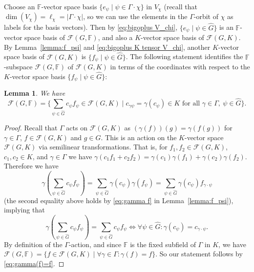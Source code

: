 \documentclass[12pt, oneside]{amsart}
\newtheorem{lemma}[theorem]{\bf Lemma}
\def\field{K}
\def\FF{\mathbb{F}}
\begin{document}
Choose an $\FF$-vector space basis $\{e_\psi\mid \psi\in \Gamma\cdot \chi\}$ in 
$V_\chi$ (recall that $\dim(V_\chi)=\ell_\chi=|\Gamma\cdot \chi|$, so we can use 
the elements in the $\Gamma$-orbit of $\chi$ as labels for the basis vectors). 
Then by \eqref{eq:bigoplus V_chi}, 
$\{e_\psi\mid \psi\in \widehat G\}$ is an $\FF$-vector space basis of $\mathcal{F}(G,\FF)$, and 
also a $\field$-vector space basis of $\mathcal{F}(G,\field)$. 
By Lemma~\ref{lemma:f_psi} and \eqref{eq:bigoplus K tensor V_chi}, another $\field$-vector space basis of 
$\mathcal{F}(G,\field)$ is 
$\{f_\psi\mid \psi\in \widehat G\}$.  
The following statement identifies the $\FF$-subspace $\mathcal{F}(G,\FF)$ of 
$\mathcal{F}(G,\field)$ in terms of the coordinates with respect to the 
$\field$-vector space basis 
$\{f_\psi\mid \psi\in \widehat G\}$:  

\begin{lemma} \label{lemma:F(G,F)} 
We have 
\[\mathcal{F}(G,\FF)=
\{\sum_{\psi\in\widehat G} c_\psi f_\psi\in \mathcal{F}(G,\field)\mid c_{\gamma\psi}=\gamma(c_\psi)\in \field\text{ for all }
\gamma\in\Gamma, \ \psi\in\widehat  G\}.\] 
\end{lemma} 

\begin{proof} 
Recall that $\Gamma$ acts on $\mathcal{F}(G,\field)$ as $(\gamma(f))(g)=\gamma(f(g))$ for 
$\gamma\in \Gamma$, $f\in \mathcal{F}(G,\field)$ and $g\in G$. This is an action on the $\field$-vector space $\mathcal{F}(G,\field)$ 
via semilinear transformations. That is,  
for $f_1,f_2\in \mathcal{F}(G,\field)$, $c_1,c_2\in \field$, and $\gamma\in \Gamma$ we have 
$\gamma(c_1f_1+c_2f_2)=\gamma(c_1)\gamma(f_1)+\gamma(c_2)\gamma(f_2)$. 
Therefore we have 
\[\gamma(\sum_{\psi\in\widehat G} c_\psi f_\psi)=\sum_{\psi\in\widehat G} \gamma(c_\psi) \gamma(f_\psi)=
\sum_{\psi\in\widehat G} \gamma(c_\psi) f_{\gamma\cdot \psi}\] 
(the second equality above holds by \eqref{eq:gamma f} in Lemma~\ref{lemma:f_psi}), 
implying that 
\begin{equation}\label{eq:gamma(f)=f} 
\gamma(\sum_{\psi\in\widehat G} c_\psi f_\psi)=\sum_{\psi\in\widehat G} c_\psi f_\psi\iff 
\forall \psi\in\widehat G: \gamma(c_\psi)=c_{\gamma\cdot\psi}.
\end{equation}  
By definition of the $\Gamma$-action, and since $\FF$ is the fixed subfield of $\Gamma$ in $\field$, 
we have 
$\mathcal{F}(G,\FF)=\{f\in \mathcal{F}(G,\field)\mid \forall \gamma\in \Gamma:\gamma(f)=f\}$. 
So our statement follows by \eqref{eq:gamma(f)=f}.  
\end{proof} 
\end{document}
